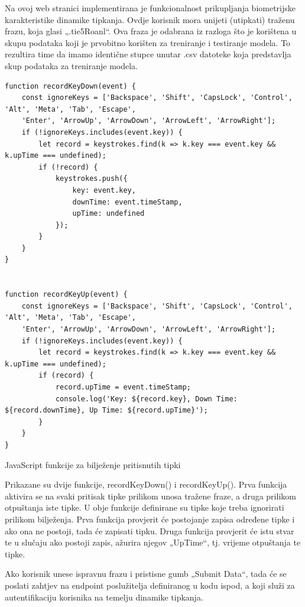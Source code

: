 \documentclass[]{foi}
\begin{document}
Na ovoj web stranici implementirana je funkcionalnost prikupljanja biometrijske karakteristike dinamike tipkanja. Ovdje korisnik mora unijeti (utipkati) traženu frazu, koja glasi „.tie5Roanl“. Ova fraza je odabrana iz razloga što je korištena u skupu podataka koji je prvobitno korišten za treniranje i testiranje modela. To rezultira time da imamo identične stupce unutar .csv datoteke koja predstavlja skup podataka za treniranje modela.


\begin{listing}
\begin{verbatim}
function recordKeyDown(event) {
    const ignoreKeys = ['Backspace', 'Shift', 'CapsLock', 'Control', 'Alt', 'Meta', 'Tab', 'Escape', 
    'Enter', 'ArrowUp', 'ArrowDown', 'ArrowLeft', 'ArrowRight'];
    if (!ignoreKeys.includes(event.key)) {
        let record = keystrokes.find(k => k.key === event.key && k.upTime === undefined);
        if (!record) {
            keystrokes.push({
                key: event.key,
                downTime: event.timeStamp,
                upTime: undefined
            });
        }
    }
}


function recordKeyUp(event) {
    const ignoreKeys = ['Backspace', 'Shift', 'CapsLock', 'Control', 'Alt', 'Meta', 'Tab', 'Escape', 
    'Enter', 'ArrowUp', 'ArrowDown', 'ArrowLeft', 'ArrowRight'];
    if (!ignoreKeys.includes(event.key)) {
        let record = keystrokes.find(k => k.key === event.key && k.upTime === undefined);
        if (record) {
            record.upTime = event.timeStamp;
            console.log('Key: ${record.key}, Down Time: ${record.downTime}, Up Time: ${record.upTime}');
        }
    }
}
\end{verbatim}
\caption{JavaScript funkcije za bilježenje pritisnutih tipki}
\label{lst:javascript}
\end{listing}


Prikazane su dvije funkcije, recordKeyDown() i recordKeyUp(). Prva funkcija aktivira se na svaki pritisak tipke prilikom unosa tražene fraze, a druga prilikom otpuštanja iste tipke. U obje funkcije definirane su tipke koje treba ignorirati prilikom bilježenja. Prva funkcija provjerit će postojanje zapisa određene tipke i ako ona ne postoji, tada će zapisati tipku. Druga funkcija provjerit će istu stvar te u slučaju ako postoji zapis, ažurira njegov „UpTime“, tj. vrijeme otpuštanja te tipke.

Ako korisnik unese ispravnu frazu i pristisne gumb „Submit Data“, tada će se poslati zahtjev na endpoint poslužitelja definiranog u kodu ispod, a koji služi za autentifikaciju korisnika na temelju dinamike tipkanja.
\end{document}
